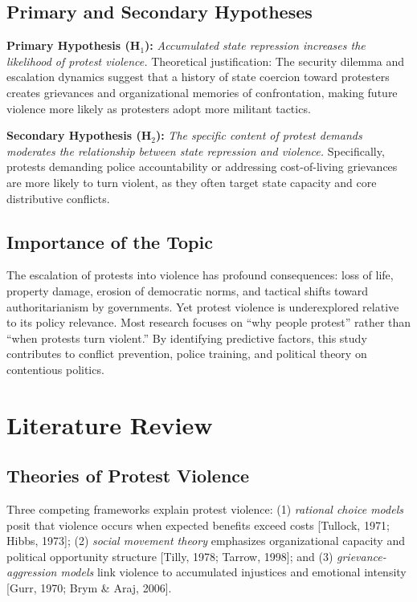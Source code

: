 \documentclass[11pt,a4paper]{article}
\begin{document}
\subsection{Primary and Secondary Hypotheses}

\textbf{Primary Hypothesis (H$_1$):} \emph{Accumulated state repression increases the likelihood of protest violence.} Theoretical justification: The security dilemma and escalation dynamics suggest that a history of state coercion toward protesters creates grievances and organizational memories of confrontation, making future violence more likely as protesters adopt more militant tactics.

\textbf{Secondary Hypothesis (H$_2$):} \emph{The specific content of protest demands moderates the relationship between state repression and violence.} Specifically, protests demanding police accountability or addressing cost-of-living grievances are more likely to turn violent, as they often target state capacity and core distributive conflicts.

\subsection{Importance of the Topic}

The escalation of protests into violence has profound consequences: loss of life, property damage, erosion of democratic norms, and tactical shifts toward authoritarianism by governments. Yet protest violence is underexplored relative to its policy relevance. Most research focuses on ``why people protest'' rather than ``when protests turn violent.'' By identifying predictive factors, this study contributes to conflict prevention, police training, and political theory on contentious politics.

\section{Literature Review}

\subsection{Theories of Protest Violence}

Three competing frameworks explain protest violence: (1) \emph{rational choice models} posit that violence occurs when expected benefits exceed costs [Tullock, 1971; Hibbs, 1973]; (2) \emph{social movement theory} emphasizes organizational capacity and political opportunity structure [Tilly, 1978; Tarrow, 1998]; and (3) \emph{grievance-aggression models} link violence to accumulated injustices and emotional intensity [Gurr, 1970; Brym \& Araj, 2006].
\end{document}
